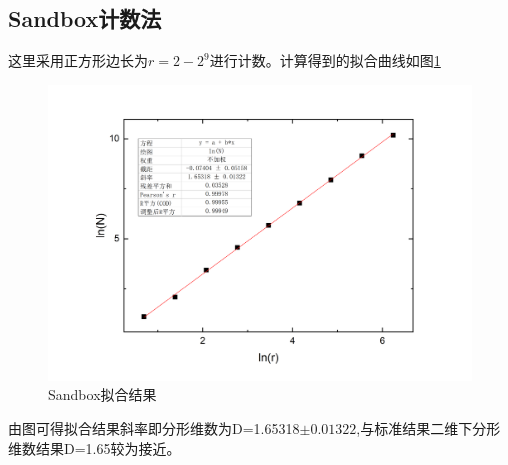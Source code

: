 \documentclass{article}
\begin{document}
\subsection{Sandbox计数法}
这里采用正方形边长为$ r=2-2^9 $进行计数。计算得到的拟合曲线如图\ref{fig:2}
		\begin{figure}[!h]
	
	\centering
	\includegraphics[scale=0.5]{sandbox}
	\caption{\heiti{}Sandbox拟合结果}
	\label{fig:2}
\end{figure}
由图可得拟合结果斜率即分形维数为D=1.65318$ \pm 0.01322 $,与标准结果二维下分形维数结果D=1.65较为接近。
\end{document}
